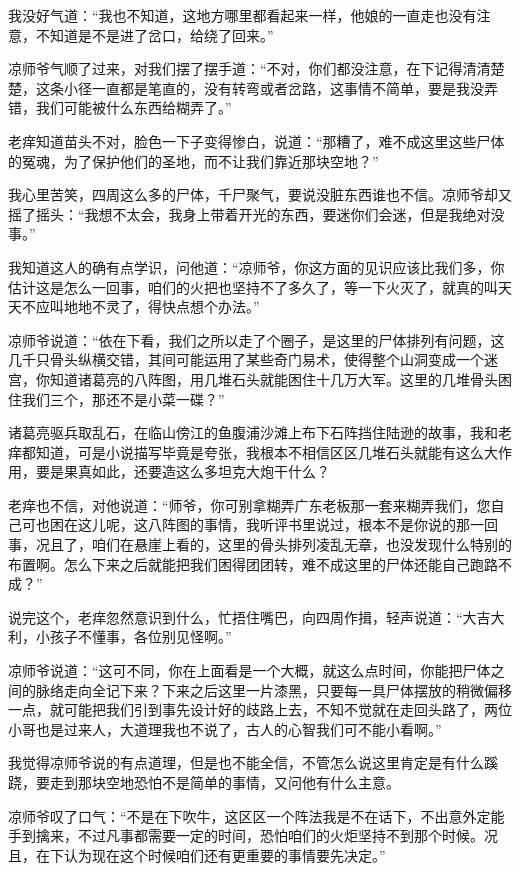 我没好气道：“我也不知道，这地方哪里都看起来一样，他娘的一直走也没有注意，不知道是不是进了岔口，给绕了回来。”

凉师爷气顺了过来，对我们摆了摆手道：“不对，你们都没注意，在下记得清清楚楚，这条小径一直都是笔直的，没有转弯或者岔路，这事情不简单，要是我没弄错，我们可能被什么东西给糊弄了。”

老痒知道苗头不对，脸色一下子变得惨白，说道：“那糟了，难不成这里这些尸体的冤魂，为了保护他们的圣地，而不让我们靠近那块空地？”

我心里苦笑，四周这么多的尸体，千尸聚气，要说没脏东西谁也不信。凉师爷却又摇了摇头：“我想不太会，我身上带着开光的东西，要迷你们会迷，但是我绝对没事。”

我知道这人的确有点学识，问他道：“凉师爷，你这方面的见识应该比我们多，你估计这是怎么一回事，咱们的火把也坚持不了多久了，等一下火灭了，就真的叫天天不应叫地地不灵了，得快点想个办法。”

凉师爷说道：“依在下看，我们之所以走了个圈子，是这里的尸体排列有问题，这几千只骨头纵横交错，其间可能运用了某些奇门易术，使得整个山洞变成一个迷宫，你知道诸葛亮的八阵图，用几堆石头就能困住十几万大军。这里的几堆骨头困住我们三个，那还不是小菜一碟？”

诸葛亮驱兵取乱石，在临山傍江的鱼腹浦沙滩上布下石阵挡住陆逊的故事，我和老痒都知道，可是小说描写毕竟是夸张，我根本不相信区区几堆石头就能有这么大作用，要是果真如此，还要造这么多坦克大炮干什么？

老痒也不信，对他说道：“师爷，你可别拿糊弄广东老板那一套来糊弄我们，您自己可也困在这儿呢，这八阵图的事情，我听评书里说过，根本不是你说的那一回事，况且了，咱们在悬崖上看的，这里的骨头排列凌乱无章，也没发现什么特别的布置啊。怎么下来之后就能把我们困得团团转，难不成这里的尸体还能自己跑路不成？”

说完这个，老痒忽然意识到什么，忙捂住嘴巴，向四周作揖，轻声说道：“大吉大利，小孩子不懂事，各位别见怪啊。”

凉师爷说道：“这可不同，你在上面看是一个大概，就这么点时间，你能把尸体之间的脉络走向全记下来？下来之后这里一片漆黑，只要每一具尸体摆放的稍微偏移一点，就可能把我们引到事先设计好的歧路上去，不知不觉就在走回头路了，两位小哥也是过来人，大道理我也不说了，古人的心智我们可不能小看啊。”

我觉得凉师爷说的有点道理，但是也不能全信，不管怎么说这里肯定是有什么蹊跷，要走到那块空地恐怕不是简单的事情，又问他有什么主意。

凉师爷叹了口气：“不是在下吹牛，这区区一个阵法我是不在话下，不出意外定能手到擒来，不过凡事都需要一定的时间，恐怕咱们的火炬坚持不到那个时候。况且，在下认为现在这个时候咱们还有更重要的事情要先决定。”

